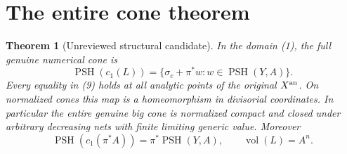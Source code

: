 \documentclass[11pt]{article}
\newcommand{\PSH}{\operatorname{PSH}}
\newcommand{\vol}{\operatorname{vol}}
\newtheorem{theorem}{Theorem}
\begin{document}
\section{The entire cone theorem}
\begin{theorem}[Unreviewed structural candidate]
In the domain (1), the full genuine numerical cone is
\[
 \PSH(c_1(L))
       =\{\sigma_c+\pi^*w:w\in\PSH(Y,A)\}.              \tag{9}
\]
Every equality in (9) holds at all analytic points of the original
$X^{\rm an}$. On normalized cones this map is a homeomorphism
in divisorial coordinates. In particular the entire genuine big
cone is normalized compact and closed under arbitrary decreasing
nets with finite limiting generic value. Moreover
\[
 \PSH(c_1(\pi^*A))=\pi^*\PSH(Y,A),\qquad
                     \vol(L)=A^n.                         \tag{10}
\]
\end{theorem}
\end{document}
